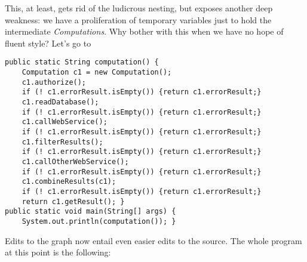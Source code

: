 \documentclass[11pt]{article}
\begin{document}
This, at least, gets rid of the ludicrous nesting, but exposes another
deep weakness: we have a proliferation of temporary variables just to
hold the intermediate \emph{Computations}. Why bother with this when we
have no hope of fluent style? Let's go to

\begin{verbatim}
public static String computation() {
    Computation c1 = new Computation();
    c1.authorize();
    if (! c1.errorResult.isEmpty()) {return c1.errorResult;}
    c1.readDatabase();
    if (! c1.errorResult.isEmpty()) {return c1.errorResult;}
    c1.callWebService();
    if (! c1.errorResult.isEmpty()) {return c1.errorResult;}
    c1.filterResults();
    if (! c1.errorResult.isEmpty()) {return c1.errorResult;}
    c1.callOtherWebService();
    if (! c1.errorResult.isEmpty()) {return c1.errorResult;}
    c1.combineResults(c1);
    if (! c1.errorResult.isEmpty()) {return c1.errorResult;}
    return c1.getResult(); }
public static void main(String[] args) {
    System.out.println(computation()); }
\end{verbatim}

Edits to the graph now entail even easier edits to the source. The
whole program at this point is the following:
\end{document}
